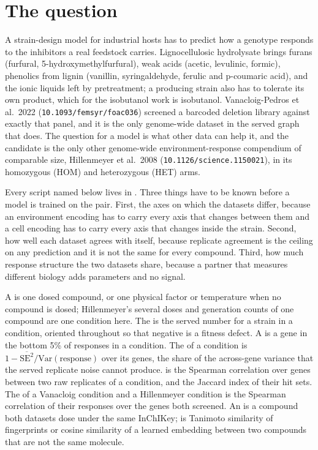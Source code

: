 
\section{The question}
\label{sec:question}

A strain-design model for industrial hosts has to predict how a genotype responds to
the inhibitors a real feedstock carries. Lignocellulosic hydrolysate brings furans
(furfural, 5-hydroxymethylfurfural), weak acids (acetic, levulinic, formic), phenolics
from lignin (vanillin, syringaldehyde, ferulic and p-coumaric acid), and the ionic
liquids left by pretreatment; a producing strain also has to tolerate its own product,
which for the isobutanol work is isobutanol. Vanacloig-Pedros et al.\ 2022
(\texttt{10.1093/femsyr/foac036}) screened a barcoded deletion library against exactly
that panel, and it is the only genome-wide dataset in the served graph that does. The
question for a model is what other data can help it, and the candidate is the only
other genome-wide environment-response compendium of comparable size, Hillenmeyer et
al.\ 2008 (\texttt{10.1126/science.1150021}), in its homozygous (HOM) and heterozygous
(HET) arms.

Every script named below lives in
. Three things have to
be known before a model is trained on the pair. First, the axes
on which the datasets differ, because an environment encoding has to carry every axis
that changes between them and a cell encoding has to carry every axis that changes
inside the strain. Second, how well each dataset agrees with itself, because replicate
agreement is the ceiling on any prediction and it is not the same for every compound.
Third, how much response structure the two datasets share, because a partner that
measures different biology adds parameters and no signal.

A  is one dosed compound, or one physical factor or temperature when no
compound is dosed; Hillenmeyer's several doses and generation counts of one compound are
one condition here. The  is the served number for a strain in a
condition, oriented throughout so that negative is a fitness defect. A  is a
gene in the bottom 5\% of responses in a condition. The  of a
condition is $1 - \overline{\mathrm{SE}^2} / \mathrm{Var}(\text{response})$ over its
genes, the share of the across-gene variance that the served replicate noise cannot
produce.  is the Spearman correlation over genes between two
raw replicates of a condition, and  the Jaccard index of their hit
sets. The  of a Vanacloig condition and a Hillenmeyer condition is
the Spearman correlation of their responses over the genes both screened. An
 is a compound both datasets dose under the same InChIKey;
 is Tanimoto similarity of fingerprints or cosine similarity of
a learned embedding between two compounds that are not the same molecule.

